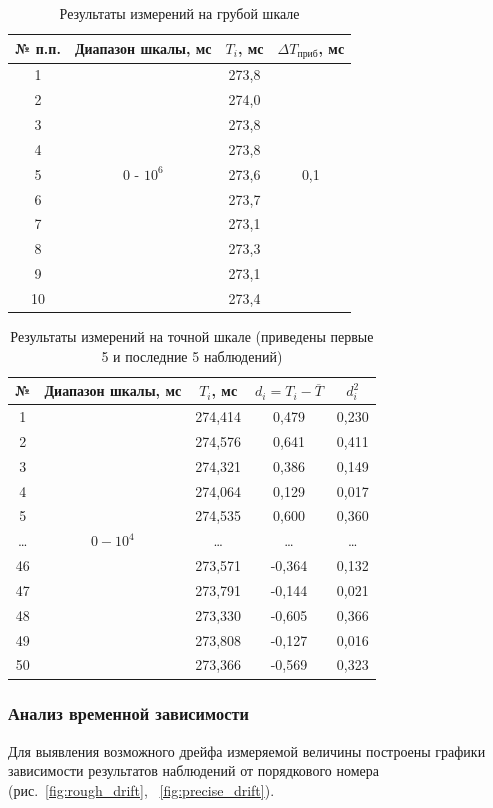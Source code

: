 \begin{table}[ht!]
\centering
\caption{Результаты измерений на грубой шкале}
\label{tab:rough}
\begin{tabular}{|c|c|c|c|}
\hline
№ п.п. & Диапазон шкалы, мс & \(T_i\), мс & \(\Delta T_{\textit{приб}}\), мс \\
\hline
1  &      & 273,8 &  \\
2  &      & 274,0 &  \\
3  &      & 273,8 &  \\
4  &      & 273,8 &  \\
5  & 0 - $10^6$ & 273,6 & 0,1\\
6  &      & 273,7 &  \\
7  &      & 273,1 &  \\
8  &      & 273,3 &  \\
9  &      & 273,1 &  \\
10 &      & 273,4 &  \\
\hline
\end{tabular}
\end{table}

\begin{table}[ht!]
\centering
\caption{Результаты измерений на точной шкале (приведены первые 5 и последние 5 наблюдений)}
\label{tab:exact}
\begin{tabular}{|c|c|c|c|c|}
\hline
№ & Диапазон шкалы, мс & \(T_i\), мс & \(d_i = T_i-\overline{T}\) & \(d_i^2\) \\
\hline
1  & & 274,414 & 0,479 & 0,230  \\
2  & & 274,576 & 0,641 & 0,411  \\
3  & & 274,321 & 0,386 & 0,149 \\
4  & & 274,064 & 0,129 & 0,017  \\
5  & & 274,535 & 0,600 & 0,360  \\
\dots & $0-10^4$ & \dots & \dots & \dots \\
46 & & 273,571 & -0,364 & 0,132  \\
47 & & 273,791 & -0,144 & 0,021  \\
48 & & 273,330 & -0,605 & 0,366  \\
49 & & 273,808 & -0,127 & 0,016 \\
50 & & 273,366 & -0,569 & 0,323 \\
\hline
\end{tabular}
\end{table}

\subsubsection{Анализ временной зависимости}
Для выявления возможного дрейфа измеряемой величины построены графики зависимости результатов наблюдений от порядкового номера (рис.~\ref{fig:rough_drift}, ~\ref{fig:precise_drift}).

